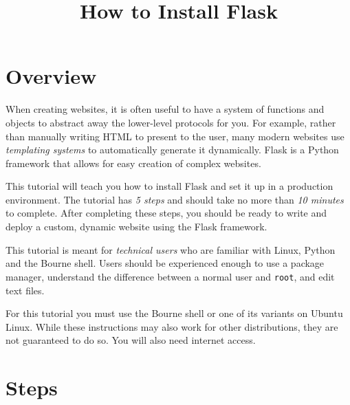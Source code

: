\documentclass{article}
\title{How to Install Flask} \date{}
\begin{document}
\maketitle
\section{Overview}
When creating websites, it is often useful to have a system of functions and objects
to abstract away the lower-level protocols for you. For example, rather than manually
writing HTML to present to the user, many modern websites use {\em templating systems}
to automatically generate it dynamically. Flask is a Python framework that allows
for easy creation of complex websites.

This tutorial will teach you how to install Flask and set it up in a production environment.
The tutorial has {\em 5 steps} and should take no more than {\em 10 minutes} to complete.
After completing these steps, you should be ready to write and deploy a custom, dynamic
website using the Flask framework.

This tutorial is meant for {\em technical users} who are familiar with Linux, Python and
the Bourne shell. Users should be experienced enough to use a package manager, understand
the difference between a normal user and \texttt{root}, and edit text files.

For this tutorial you must use the Bourne shell or one of its variants on Ubuntu Linux.
While these instructions may also work for other distributions, they are not guaranteed
to do so. You will also need internet access.

\pagebreak

\section{Steps}
\end{document}
